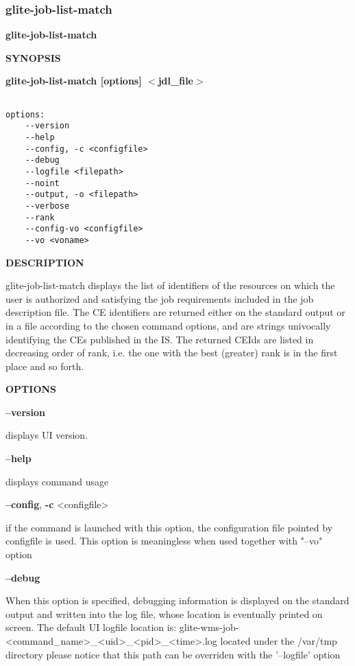\subsubsection{glite-job-list-match}
\label{glite-job-list-match}

\medskip
\textbf{glite-job-list-match}
\smallskip


\medskip
\textbf{SYNOPSIS}
\smallskip

\textbf{glite-job-list-match [options]  $<$jdl\_file$>$}
{\begin{verbatim}

options:
	--version
	--help
	--config, -c <configfile>
	--debug
	--logfile <filepath>
	--noint
	--output, -o <filepath>
	--verbose
	--rank
	--config-vo <configfile>
	--vo <voname>
\end{verbatim}

\medskip
\textbf{DESCRIPTION}
\smallskip


glite-job-list-match displays the list of identifiers of the resources on which the user is authorized and satisfying the job requirements included in the job description file. The CE identifiers are returned either on the standard output or in a file according to the chosen command options, and are strings univocally identifying the CEs published in the IS.
The returned CEIds are listed in decreasing order of rank, i.e. the one with the best (greater) rank is in the first place and so forth.

\medskip
\textbf{OPTIONS}
\smallskip

\textbf{--version}

displays UI version.

\textbf{--help}

displays command usage

\textbf{--config}, \textbf{-c} <configfile>

if the command is launched with this option, the configuration file pointed by configfile is used. This option is meaningless when used together with "--vo" option

\textbf{--debug}

When this option is specified, debugging information is displayed on the standard output and written into the log file, whose location is eventually printed on screen.
The default UI logfile location is:
glite-wms-job-<command\_name>\_<uid>\_<pid>\_<time>.log  located under the /var/tmp directory
please notice that this path can be overriden with the '--logfile' option

}
